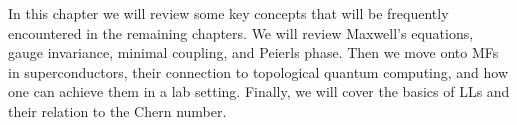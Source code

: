 In this chapter we will review some key concepts that will be frequently encountered in the remaining chapters.
We will review Maxwell's equations, gauge invariance, minimal coupling, and Peierls phase.
Then we move onto MFs in superconductors, their connection to topological quantum computing, and how one can achieve them in a lab setting.
Finally, we will cover the basics of LLs and their relation to the Chern number.

